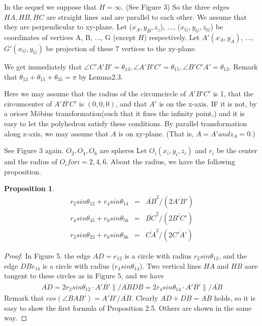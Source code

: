 \documentclass[dvipdfmx]{interact}
\theoremstyle{plain}%
\newtheorem{proposition}[theorem]{Proposition}
\theoremstyle{definition}
\theoremstyle{remark}
\theoremstyle{problemstyle}
\begin{document}
In the sequel we suppose that $H = \infty$. (See Figure 3) So the three
edges $HA, HB, HC$ are straight lines and are parallel to each other. We
assume that they are perpendicular to xy-plane.
Let ($x_A, y_B, z_z$), ..., ($x_G, y_G, z_G$) be coordinates of vertices
A, B, ..., G (except $H$) respectively. Let $A'(x_A, y_A)$, ...,$G'(x_G,
y_G)$ be projection of these 7 vertices to the xy-plane.

We get immediately that $\angle C'A'B' = \theta_{13}, \angle A'B'C' =
\theta_{15}, \angle B'C'A'=\theta_{13}$. Remark that $\theta_{13} +
\theta_{15} + \theta_{35} = \pi$ by Lemma2.3.

Here we may assume that the radius of the circumcircle of $A'B'C'$ is 1,
that the circumcenter of $A'B'C'$ is $(0, 0, 0)$, and that $A'$ is on
the x-axis. IF it is not, by a orioer M\"obius transformation(such that
it fixes the infinity point,) and it is easy to let the polyhedron
satisfy these conditions. By parallel transformation along z-axis, we
may assume that $A$ is on xy-plane. (That is, $A = A' and z_A = 0.$)

See Figure 3 again. $O_2, O_4, O_6$ are spheres Let $O_i(x_i, y_i, z_i)$
and $r_i$ be the center and the radius of $O_i for i = 2, 4, 6.$ About
the radius, we have the following proposition.

\begin{proposition}
 \begin{eqnarray}
 r_2sin\theta_{12} + r_4sin\theta_{14} &=& \overline{AB}^2 / (2\overline{A'B'})\\
 r_4sin\theta_{45} + r_6sin\theta_{56} &=& \overline{BC}^2 / (2\overline{B'C'})\\
 r_2sin\theta_{23} + r_6sin\theta_{36} &=& \overline{CA}^2 / (2\overline{C'A'})
 \end{eqnarray}
\end{proposition}

\begin{proof}
 In Figure 5. the edge $AD = e_{12}$ is a circle with radius
 $r_2sin\theta_{12}$, and the edge $DB e_{14}$ is a circle with radius
 ($r_4sin\theta_{14}$).
Two vertical lines $HA$ and $HB$ aare tangent to these circles as in
 Figure 5,
 and we have 
 \begin{eqnarray*}
  \overline{AD} = 2 r_2 sin\theta_{12} \cdot \overline{A'B'\|}/\overline{AB}
  \overline{DB} = 2 r_4 sin\theta_{14} \cdot \overline{A'B'\|}/\overline{AB}
 \end{eqnarray*}
 Remark that $cos(\angle BAB') =\overline{A'B'}/\overline{AB}.$ Clearly
 $\overline{AD} + \overline{DB} = \overline{AB}$ holds, so it is easy to
 show the first formula of Proposition 2.5. Others are shown in the same
 way.

\end{proof}
\end{document}
